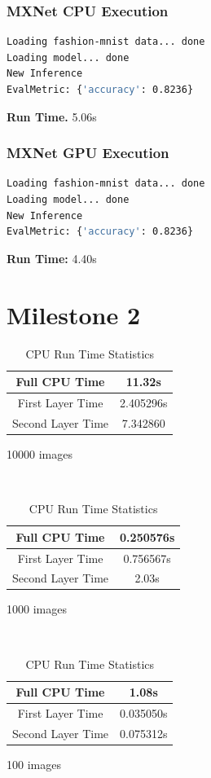 \documentclass{article}
\begin{document}
\section{MXNet CPU Execution}
\begin{lstlisting}[language=bash]
Loading fashion-mnist data... done
Loading model... done
New Inference
EvalMetric: {'accuracy': 0.8236}
\end{lstlisting}

\textbf{Run Time.} 5.06s

\pagebreak
\section{MXNet GPU Execution}
\begin{lstlisting}[language=bash]
Loading fashion-mnist data... done
Loading model... done
New Inference
EvalMetric: {'accuracy': 0.8236}
\end{lstlisting}

\textbf{Run Time:} 4.40s

\part*{Milestone 2}
\setcounter{section}{0}

\begin{table}[H]
    \centering
    \begin{minipage}{.32\linewidth}
        \begin{tabular}{c|c}
            Full CPU Time & 11.32s \\ \hline
            First Layer Time & 2.405296s \\ \hline
            Second Layer Time & 7.342860
        \end{tabular}
        \caption*{10000 images}
    \end{minipage}
    ~
    \begin{minipage}{.32\linewidth}
        \begin{tabular}{c|c}
            Full CPU Time & 0.250576s \\ \hline
            First Layer Time & 0.756567s \\ \hline
            Second Layer Time & 2.03s
        \end{tabular}
        \caption*{1000 images}
    \end{minipage}
    ~
    \begin{minipage}{.32\linewidth}
        \begin{tabular}{c|c}
            Full CPU Time & 1.08s \\ \hline
            First Layer Time & 0.035050s \\ \hline
            Second Layer Time & 0.075312s
        \end{tabular}
        \caption*{100 images}
    \end{minipage}
    \caption{CPU Run Time Statistics}
\end{table}
\end{document}
